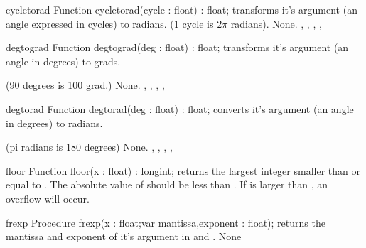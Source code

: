 

\begin{function}{cycletorad}
\Declaration
Function cycletorad(cycle : float) : float;
\Description
{} transforms it's argument 
(an angle expressed in cycles) to radians.
(1 cycle is $2 \pi$ radians).
\Errors
None.
\SeeAlso
{}, , ,
, 
\end{function}



\begin{function}{degtograd}
\Declaration
Function degtograd(deg : float) : float;
\Description
{} transforms it's argument  (an angle in degrees)
to grads.

(90 degrees is 100 grad.)
\Errors
None.
\SeeAlso
{}, , ,
, 
\end{function}



\begin{function}{degtorad}
\Declaration
Function degtorad(deg : float) : float;
\Description
{} converts it's argument  (an angle in degrees) to
radians.

(pi radians is 180 degrees)
\Errors
None.
\SeeAlso
{}, , ,
, 
\end{function}



\begin{function}{floor}
\Declaration
Function floor(x : float) : longint;
\Description
{} returns the largest integer smaller than or equal to .
The absolute value of  should be less than .
\Errors
If  is larger than , an overflow will occur.
\SeeAlso
{}
\end{function}



\begin{procedure}{frexp}
\Declaration
Procedure frexp(x : float;var mantissa,exponent : float);
\Description
{} returns the mantissa and exponent of it's argument
 in  and .
\Errors
None
\SeeAlso
\end{procedure}



